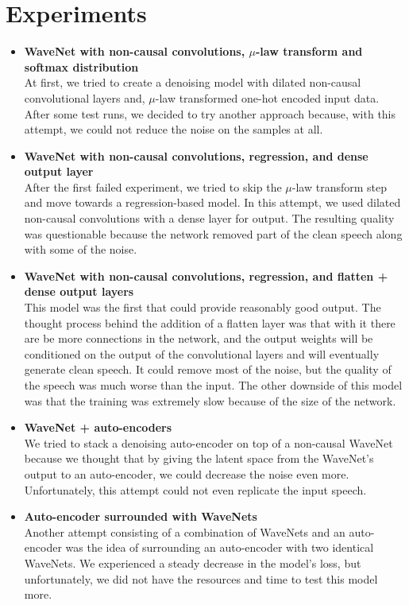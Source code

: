 \documentclass{article}
\begin{document}
	\section{Experiments}
	\begin{itemize}
	\item \textbf{WaveNet with non-causal convolutions, \boldmath$\mu$-law transform and softmax distribution} \\
	At first, we tried to create a denoising model with dilated non-causal convolutional layers and, $\mu$-law transformed one-hot encoded input data. After some test runs, we decided to try another approach because, with this attempt, we could not reduce the noise on the samples at all.
	\item \textbf{WaveNet with non-causal convolutions, regression, and dense output layer} \\
	After the first failed experiment, we tried to skip the $\mu$-law transform step and move towards a regression-based model. In this attempt, we used dilated non-causal convolutions with a dense layer for output. The resulting quality was questionable because the network removed part of the clean speech along with some of the noise.
	\item \textbf{WaveNet with non-causal convolutions, regression, and flatten + dense output layers} \\
	This model was the first that could provide reasonably good output. The thought process behind the addition of a flatten layer was that with it there are be more connections in the network, and the output weights will be conditioned on the output of the convolutional layers and will eventually generate clean speech. It could remove most of the noise, but the quality of the speech was much worse than the input. The other downside of this model was that the training was extremely slow because of the size of the network.
	\item \textbf{WaveNet + auto-encoders} \\
	We tried to stack a denoising auto-encoder on top of a non-causal WaveNet because we thought that by giving the latent space from the WaveNet's output to an auto-encoder, we could decrease the noise even more. Unfortunately, this attempt could not even replicate the input speech.
	\item \textbf {Auto-encoder surrounded with WaveNets} \\
	Another attempt consisting of a combination of WaveNets and an auto-encoder was the idea of surrounding an auto-encoder with two identical WaveNets. We experienced a steady decrease in the model's loss, but unfortunately, we did not have the resources and time to test this model more.

\end{itemize}
\end{document}
